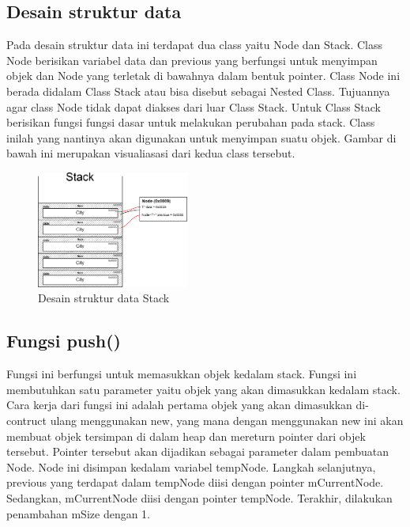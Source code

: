 \documentclass[]{article}
\begin{document}
\subsection{Desain struktur data}
\par
Pada desain struktur data ini terdapat dua class yaitu Node dan Stack. 
Class Node berisikan variabel data dan previous yang berfungsi untuk menyimpan
objek dan Node yang terletak di bawahnya dalam bentuk pointer. 
Class Node ini berada didalam Class Stack atau bisa disebut sebagai
Nested Class. Tujuannya agar class Node tidak dapat diakses dari luar
Class Stack. Untuk Class Stack berisikan fungsi fungsi dasar untuk
melakukan perubahan pada stack. Class inilah yang nantinya akan digunakan untuk menyimpan suatu objek.
Gambar di bawah ini merupakan visualiasasi dari kedua class tersebut.
\begin{figure}[htp]
    \centering
    \includegraphics[width=5cm]{visualisasi.png}
    \caption{Desain struktur data Stack}
    \label{fig:galaxy}
\end{figure}
\subsection{Fungsi push()}

\par
Fungsi ini berfungsi untuk memasukkan objek kedalam stack. Fungsi ini membutuhkan satu parameter yaitu objek yang
akan dimasukkan kedalam stack. Cara kerja dari fungsi ini adalah pertama objek yang akan dimasukkan di-contruct ulang
menggunakan new, yang mana dengan menggunakan new ini akan membuat objek tersimpan di dalam heap dan mereturn pointer dari objek tersebut. 
Pointer tersebut akan dijadikan sebagai parameter dalam pembuatan Node. Node ini disimpan kedalam variabel tempNode. Langkah selanjutnya,
previous yang terdapat dalam tempNode diisi dengan pointer mCurrentNode. Sedangkan, mCurrentNode diisi dengan pointer tempNode. Terakhir,
dilakukan penambahan mSize dengan 1.
\end{document}
